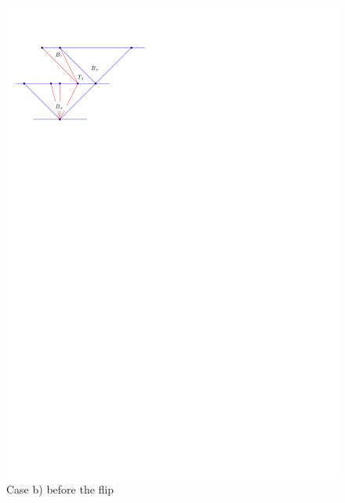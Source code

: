 \begin{figure}[h]
  \centering
  \includegraphics[scale=1]{unifiedAlgo/img/flipcaseb}
  \caption{Case b) before the flip}
  \label{fig:uni:flipcaseb}
\end{figure}

